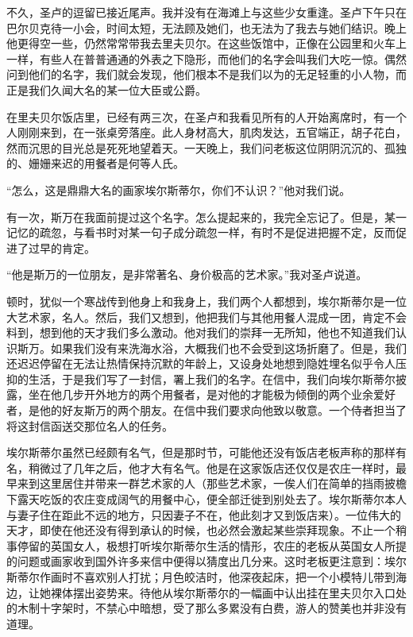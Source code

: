 \par 不久，圣卢的逗留已接近尾声。我并没有在海滩上与这些少女重逢。圣卢下午只在巴尔贝克待一小会，时间太短，无法顾及她们，也无法为了我去与她们结识。晚上他更得空一些，仍然常常带我去里夫贝尔。在这些饭馆中，正像在公园里和火车上一样，有些人在普普通通的外表之下隐形，而他们的名字会叫我们大吃一惊。偶然问到他们的名字，我们就会发现，他们根本不是我们以为的无足轻重的小人物，而正是我们久闻大名的某一位大臣或公爵。
\par 在里夫贝尔饭店里，已经有两三次，在圣卢和我看见所有的人开始离席时，有一个人刚刚来到，在一张桌旁落座。此人身材高大，肌肉发达，五官端正，胡子花白，然而沉思的目光总是死死地望着天。一天晚上，我们问老板这位阴阴沉沉的、孤独的、姗姗来迟的用餐者是何等人氏。
\par “怎么，这是鼎鼎大名的画家埃尔斯蒂尔，你们不认识？”他对我们说。
\par 有一次，斯万在我面前提过这个名字。怎么提起来的，我完全忘记了。但是，某一记忆的疏忽，与看书时对某一句子成分疏忽一样，有时不是促进把握不定，反而促进了过早的肯定。
\par “他是斯万的一位朋友，是非常著名、身价极高的艺术家。”我对圣卢说道。
\par 顿时，犹似一个寒战传到他身上和我身上，我们两个人都想到，埃尔斯蒂尔是一位大艺术家，名人。然后，我们又想到，他把我们与其他用餐人混成一团，肯定不会料到，想到他的天才我们多么激动。他对我们的崇拜一无所知，他也不知道我们认识斯万。如果我们没有来洗海水浴，大概我们也不会受到这场折磨了。但是，我们还迟迟停留在无法让热情保持沉默的年龄上，又设身处地想到隐姓埋名似乎令人压抑的生活，于是我们写了一封信，署上我们的名字。在信中，我们向埃尔斯蒂尔披露，坐在他几步开外地方的两个用餐者，是对他的才能极为倾倒的两个业余爱好者，是他的好友斯万的两个朋友。在信中我们要求向他致以敬意。一个侍者担当了将这封信函送交那位名人的任务。
\par 埃尔斯蒂尔虽然已经颇有名气，但是那时节，可能他还没有饭店老板声称的那样有名，稍微过了几年之后，他才大有名气。他是在这家饭店还仅仅是农庄一样时，最早来到这里居住并带来一群艺术家的人（那些艺术家，一俟人们在简单的挡雨披檐下露天吃饭的农庄变成阔气的用餐中心，便全部迁徙到别处去了。埃尔斯蒂尔本人与妻子住在距此不远的地方，只因妻子不在，他此刻才又到饭店来）。一位伟大的天才，即使在他还没有得到承认的时候，也必然会激起某些崇拜现象。不止一个稍事停留的英国女人，极想打听埃尔斯蒂尔生活的情形，农庄的老板从英国女人所提的问题或画家收到国外许多来信中便得以猜度出几分来。这时老板更注意到：埃尔斯蒂尔作画时不喜欢别人打扰；月色皎洁时，他深夜起床，把一个小模特儿带到海边，让她裸体摆出姿势来。待他从埃尔斯蒂尔的一幅画中认出挂在里夫贝尔入口处的木制十字架时，不禁心中暗想，受了那么多累没有白费，游人的赞美也并非没有道理。
